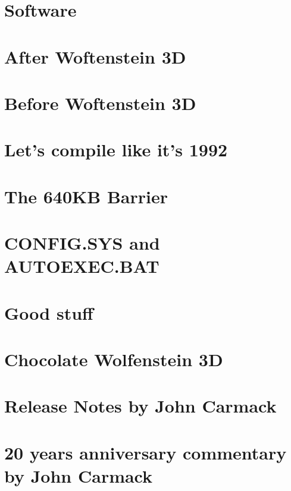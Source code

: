 \documentclass[8pt]{book}
\begin{document}
    \chapter{Software}
       
       
       
       
       
    \chapter{After Woftenstein 3D}
        
        
        
        
    \chapter{Before Woftenstein 3D}
        
    \appendix
    \appendixpage

    \chapter{Let's compile like it's 1992}
    \chapter{The 640KB Barrier}\label{chap:barrier640}
        
    \chapter{CONFIG.SYS and AUTOEXEC.BAT}
         
    \chapter{Good stuff}
          
    \chapter{Chocolate Wolfenstein 3D}
    \chapter{Release Notes by John Carmack}
        
    \chapter{20 years anniversary commentary by John Carmack}
        

\end{document}
